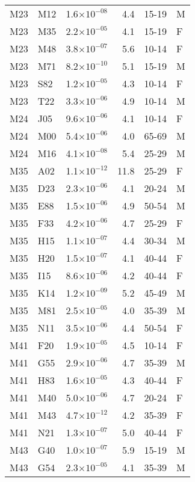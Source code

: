 \begin{longtable}{lllrll}
   M23 & M12 & 1.6$\times10^{-08}$ & 4.4 & 15-19 & M \\ 
   M23 & M35 & 2.2$\times10^{-05}$ & 4.1 & 15-19 & F \\ 
   M23 & M48 & 3.8$\times10^{-07}$ & 5.6 & 10-14 & F \\ 
   M23 & M71 & 8.2$\times10^{-10}$ & 5.1 & 15-19 & M \\ 
   M23 & S82 & 1.2$\times10^{-05}$ & 4.3 & 10-14 & F \\ 
   M23 & T22 & 3.3$\times10^{-06}$ & 4.9 & 10-14 & M \\ 
   M24 & J05 & 9.6$\times10^{-06}$ & 4.1 & 10-14 & F \\ 
   M24 & M00 & 5.4$\times10^{-06}$ & 4.0 & 65-69 & M \\ 
   M24 & M16 & 4.1$\times10^{-08}$ & 5.4 & 25-29 & M \\ 
   M35 & A02 & 1.1$\times10^{-12}$ & 11.8 & 25-29 & F \\ 
   M35 & D23 & 2.3$\times10^{-06}$ & 4.1 & 20-24 & M \\ 
   M35 & E88 & 1.5$\times10^{-06}$ & 4.9 & 50-54 & M \\ 
   M35 & F33 & 4.2$\times10^{-06}$ & 4.7 & 25-29 & F \\ 
   M35 & H15 & 1.1$\times10^{-07}$ & 4.4 & 30-34 & M \\ 
   M35 & H20 & 1.5$\times10^{-07}$ & 4.1 & 40-44 & F \\ 
   M35 & I15 & 8.6$\times10^{-06}$ & 4.2 & 40-44 & F \\ 
   M35 & K14 & 1.2$\times10^{-09}$ & 5.2 & 45-49 & M \\ 
   M35 & M81 & 2.5$\times10^{-05}$ & 4.0 & 35-39 & M \\ 
   M35 & N11 & 3.5$\times10^{-06}$ & 4.4 & 50-54 & F \\ 
   M41 & F20 & 1.9$\times10^{-05}$ & 4.5 & 10-14 & F \\ 
   M41 & G55 & 2.9$\times10^{-06}$ & 4.7 & 35-39 & M \\ 
   M41 & H83 & 1.6$\times10^{-05}$ & 4.3 & 40-44 & F \\ 
   M41 & M40 & 5.0$\times10^{-06}$ & 4.7 & 20-24 & F \\ 
   M41 & M43 & 4.7$\times10^{-12}$ & 4.2 & 35-39 & F \\ 
   M41 & N21 & 1.3$\times10^{-07}$ & 5.0 & 40-44 & F \\ 
   M43 & G40 & 1.0$\times10^{-07}$ & 5.9 & 15-19 & M \\ 
   M43 & G54 & 2.3$\times10^{-05}$ & 4.1 & 35-39 & M \\ 

\end{longtable}
